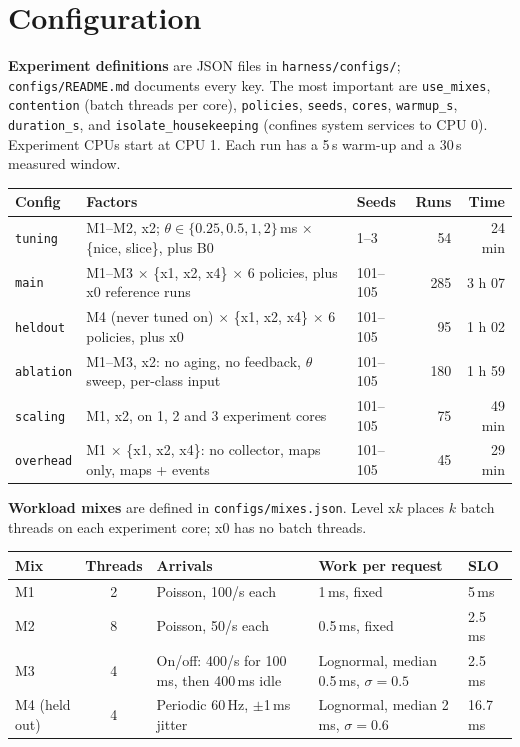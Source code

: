 \documentclass[10.5pt,a4paper]{article}
\newcommand{\f}[1]{\texttt{#1}}
\begin{document}
\section{Configuration}

\textbf{Experiment definitions} are JSON files in \f{harness/configs/}; \f{configs/README.md} documents every key. The most important are \f{use\_mixes}, \f{contention} (batch threads per core), \f{policies}, \f{seeds}, \f{cores}, \f{warmup\_s}, \f{duration\_s}, and \f{isolate\_housekeeping} (confines system services to CPU 0). Experiment CPUs start at CPU 1. Each run has a 5\,s warm-up and a 30\,s measured window.

\begin{center}
\begin{tabularx}{\textwidth}{@{}lLlrr@{}}
\toprule
\textbf{Config} & \textbf{Factors} & \textbf{Seeds} & \textbf{Runs} & \textbf{Time} \\
\midrule
\f{tuning} & M1--M2, x2; $\theta \in \{0.25, 0.5, 1, 2\}$\,ms $\times$ \{nice, slice\}, plus B0 & 1--3 & 54 & 24 min \\
\f{main} & M1--M3 $\times$ \{x1, x2, x4\} $\times$ 6 policies, plus x0 reference runs & 101--105 & 285 & 3 h 07 \\
\f{heldout} & M4 (never tuned on) $\times$ \{x1, x2, x4\} $\times$ 6 policies, plus x0 & 101--105 & 95 & 1 h 02 \\
\f{ablation} & M1--M3, x2: no aging, no feedback, $\theta$ sweep, per-class input & 101--105 & 180 & 1 h 59 \\
\f{scaling} & M1, x2, on 1, 2 and 3 experiment cores & 101--105 & 75 & 49 min \\
\f{overhead} & M1 $\times$ \{x1, x2, x4\}: no collector, maps only, maps + events & 101--105 & 45 & 29 min \\
\bottomrule
\end{tabularx}
\end{center}

\textbf{Workload mixes} are defined in \f{configs/mixes.json}. Level x$k$ places $k$ batch threads on each experiment core; x0 has no batch threads.

\begin{center}
\begin{tabularx}{\textwidth}{@{}l c L L l@{}}
\toprule
\textbf{Mix} & \textbf{Threads} & \textbf{Arrivals} & \textbf{Work per request} & \textbf{SLO} \\
\midrule
M1 & 2 & Poisson, 100/s each & 1\,ms, fixed & 5\,ms \\
M2 & 8 & Poisson, 50/s each & 0.5\,ms, fixed & 2.5\,ms \\
M3 & 4 & On/off: 400/s for 100\,ms, then 400\,ms idle & Lognormal, median 0.5\,ms, $\sigma=0.5$ & 2.5\,ms \\
M4 (held out) & 4 & Periodic 60\,Hz, $\pm$1\,ms jitter & Lognormal, median 2\,ms, $\sigma=0.6$ & 16.7\,ms \\
\bottomrule
\end{tabularx}
\end{center}
\end{document}
